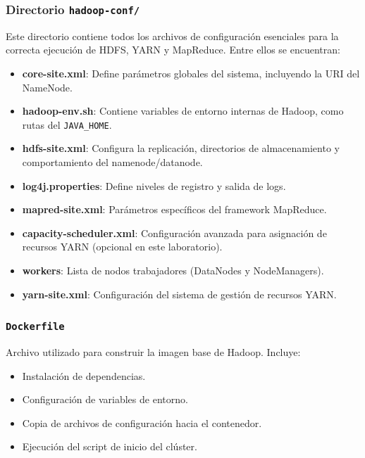 \subsubsection{Directorio \texttt{hadoop-conf/}}

Este directorio contiene todos los archivos de configuración esenciales para la correcta ejecución de HDFS, YARN y MapReduce. Entre ellos se encuentran:

\begin{itemize}
    \item \textbf{core-site.xml}: Define parámetros globales del sistema, incluyendo la URI del NameNode.
    \item \textbf{hadoop-env.sh}: Contiene variables de entorno internas de Hadoop, como rutas del \texttt{JAVA\_HOME}.
    \item \textbf{hdfs-site.xml}: Configura la replicación, directorios de almacenamiento y comportamiento del namenode/datanode.
    \item \textbf{log4j.properties}: Define niveles de registro y salida de logs.
    \item \textbf{mapred-site.xml}: Parámetros específicos del framework MapReduce.
    \item \textbf{capacity-scheduler.xml}: Configuración avanzada para asignación de recursos YARN (opcional en este laboratorio).
    \item \textbf{workers}: Lista de nodos trabajadores (DataNodes y NodeManagers).
    \item \textbf{yarn-site.xml}: Configuración del sistema de gestión de recursos YARN.
\end{itemize}

\subsubsection{\texttt{Dockerfile}}

Archivo utilizado para construir la imagen base de Hadoop. Incluye:

\begin{itemize}
    \item Instalación de dependencias.
    \item Configuración de variables de entorno.
    \item Copia de archivos de configuración hacia el contenedor.
    \item Ejecución del script de inicio del clúster.
\end{itemize}

